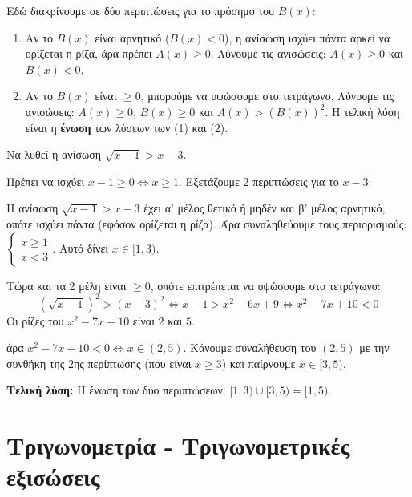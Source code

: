 
Εδώ διακρίνουμε σε δύο περιπτώσεις για το πρόσημο του $B(x)$:
\begin{enumerate}
\item Αν το $B(x)$ είναι αρνητικό ($B(x) < 0$), η ανίσωση ισχύει πάντα αρκεί να ορίζεται η ρίζα, άρα πρέπει $A(x) \geq 0$.
Λύνουμε τις ανισώσεις: $A(x) \geq 0$ και $B(x) < 0$.
\item Αν το $B(x)$ είναι $\geq 0$, μπορούμε να υψώσουμε στο τετράγωνο.
Λύνουμε τις ανισώσεις: $A(x) \geq 0$, $B(x) \geq 0 $ και $ A(x) > (B(x))^2 $.
Η τελική λύση είναι η \textbf{ένωση} των λύσεων των (1) και (2).
\end{enumerate}

Να λυθεί η ανίσωση $\sqrt{x-1} > x-3$.

\lysh
Πρέπει να ισχύει $x-1 \ge 0 \Leftrightarrow x \ge 1$.
Εξετάζουμε 2 περιπτώσεις για το $x-3$:

Η ανίσωση $\sqrt{x-1} > x-3$ έχει α' μέλος θετικό ή μηδέν και β' μέλος αρνητικό, οπότε ισχύει πάντα (εφόσον ορίζεται η ρίζα). 
Άρα συναληθεύουμε τους περιορισμούς: $\begin{cases} x \geq 1 \\ x < 3 \end{cases}$. Αυτό δίνει \textbf{$x \in [1, 3)$}.

Τώρα και τα 2 μέλη είναι $\geq 0$, οπότε επιτρέπεται να υψώσουμε στο τετράγωνο:
\[ (\sqrt{x-1})^2 > (x-3)^2 \Leftrightarrow x-1 > x^2 - 6x + 9 \Leftrightarrow x^2 - 7x + 10 < 0 \]
Οι ρίζες του $x^2 - 7x + 10$ είναι $2$ και $5$. 
\begin{center}
\end{center}
άρα $x^2-7x+10<0\Leftrightarrow x\in(2, 5)$.
Κάνουμε συναλήθευση του $(2, 5)$ με την συνθήκη της 2ης περίπτωσης (που είναι $x \geq 3$) και παίρνουμε \textbf{$x \in [3, 5)$}.

\textbf{Τελική λύση:} Η ένωση των δύο περιπτώσεων: $[1, 3) \cup [3, 5) = {[1, 5)}$.

\section{Τριγωνομετρία - Τριγωνομετρικές εξισώσεις}
